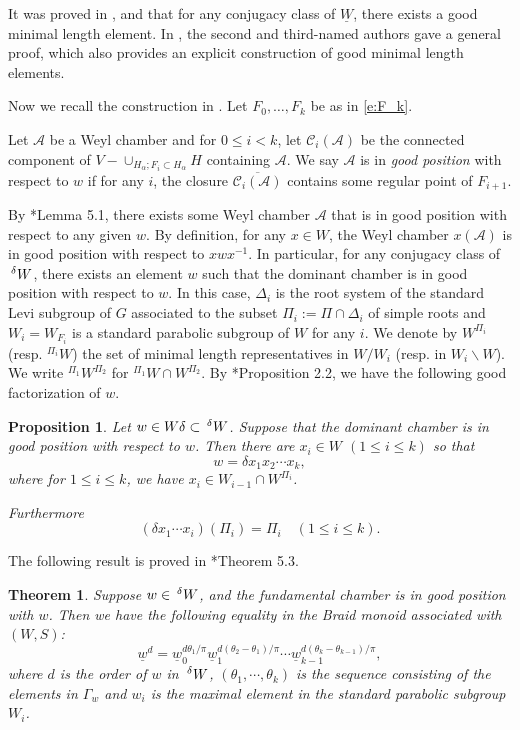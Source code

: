 \documentclass[10pt,leqno]{article}
\newtheorem{theorem}[equation]{Theorem}
\newtheorem{proposition}[equation]{Proposition}
\newcommand{\caC}{\mathcal C}
\newcommand{\caA}{\mathcal A}
\renewcommand{\a}{\mathfrak a}
\newcommand{\Wext}{\negthinspace\negthinspace\phantom{a}^\delta W}
\def\le{\leqslant}
\def\a{\alpha}
\def\G{\Gamma}
\def\d{\delta}
\begin{document}
It was proved in \cite{geck_michel_good}, \cite{gkp} and \cite{he_minimal_length_double_cosets} that for any
conjugacy class of $\underline W$, there exists a good minimal length
element. In \cite{he_nie_minimal_finite}, the second and third-named authors
gave a general proof, which also provides an explicit construction of good
minimal length elements.

Now we recall the construction in \cite{he_nie_minimal_finite}.
Let $F_0,\dots, F_k$ be as in \eqref{e:F_k}.

Let $\caA$ be a Weyl chamber and for $0 \le i < k$, let $\caC_i(\caA)$
be the connected component of $V-\cup_{H_\a; F_i \subset H_\a}H$
containing $\caA$. We say $\caA$ is in {\it good position} with
respect to $w$ if for any $i$, the closure $\overline{\caC_i(\caA)}$
contains some regular point of $F_{i+1}$.

By \cite{he_nie_minimal_finite}*{Lemma 5.1}, there exists some Weyl chamber $\caA$ that is
in good position with respect to any given $w$. By definition, for any
$x \in W$, the Weyl chamber $x(\caA)$ is in good position with respect
to $x w x^{-1}$. In particular, for any conjugacy class of $\Wext$,
there exists an element $w$ such that the dominant chamber is in good
position with respect to $w$. In this case, $\Delta_i$ is the root system
of the standard Levi subgroup of $G$ associated to the subset
$\Pi_i:=\Pi \cap \Delta_i$ of simple roots and $W_i=W_{F_i}$ is a standard
parabolic subgroup of $W$ for any $i$. We denote by $W^{\Pi_i}$ (resp. ${}^{\Pi_i} W$) the
set of minimal length representatives in $W/W_i$ (resp. in $W_i \backslash W$). We write ${}^{\Pi_1} W^{\Pi_2}$ for ${}^{\Pi_1} W \cap W^{\Pi_2}$. By \cite{he_nie_minimal_finite}*{Proposition
2.2}, we have the following good factorization of $w$.

\begin{proposition}\label{good-fac} Let $w \in W \d \subset
\Wext$. Suppose that the dominant chamber is in good position with
respect to $w$. Then there are $x_i\in W$ $(1\le i\le k)$ so that 
$$
w=\d x_1 x_2 \cdots x_k,
$$ where for $1 \le i
\le k$, we have $x_i \in W_{i-1} \cap W^{\Pi_i}$.

Furthermore
$$
(\d x_1\cdots x_i)(\Pi_i)=\Pi_i\quad (1\le i\le k).
$$

\end{proposition}

The following result is proved in \cite{he_nie_minimal_finite}*{Theorem 5.3}.

\begin{theorem}
\label{t:braid}
Suppose $w \in \Wext$, and the fundamental chamber is
in good position with $w$. Then we have the following equality in the
Braid monoid associated with $(W, S)$: $$\underline w^d=\underline
w_0^{d \theta_1/\pi} \underline w_1^{d (\theta_2-\theta_1)/\pi} \cdots
\underline w_{k-1}^{d (\theta_{k}-\theta_{k-1})/\pi},$$ where $d$ is
the order of $w$ in $\Wext$, $(\theta_1, \cdots,
\theta_k)$ is the sequence consisting of the elements in $\G_{w}$
and $w_i$ is the maximal element in the standard parabolic subgroup
$W_i$.
\end{theorem}
\end{document}
